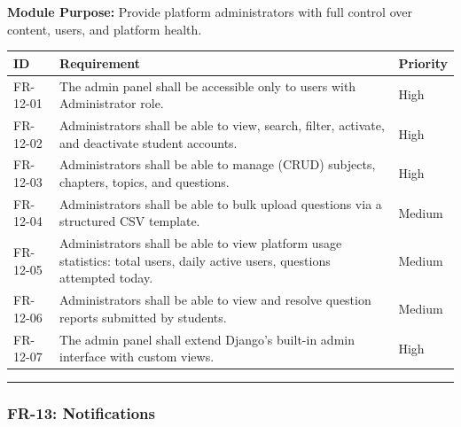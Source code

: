 \documentclass[
]{article}
\begin{document}
\textbf{Module Purpose:} Provide platform administrators with full
control over content, users, and platform health.

\begin{longtable}[]{@{}
  >{\raggedright\arraybackslash}p{}
  >{\raggedright\arraybackslash}p{}
  >{\raggedright\arraybackslash}p{}@{}}
\toprule\noalign{}
\begin{minipage}[b]{\linewidth}\raggedright
ID
\end{minipage} & \begin{minipage}[b]{\linewidth}\raggedright
Requirement
\end{minipage} & \begin{minipage}[b]{\linewidth}\raggedright
Priority
\end{minipage} \\
\midrule\noalign{}
\endhead
\bottomrule\noalign{}
\endlastfoot
FR-12-01 & The admin panel shall be accessible only to users with
Administrator role. & High \\
FR-12-02 & Administrators shall be able to view, search, filter,
activate, and deactivate student accounts. & High \\
FR-12-03 & Administrators shall be able to manage (CRUD) subjects,
chapters, topics, and questions. & High \\
FR-12-04 & Administrators shall be able to bulk upload questions via a
structured CSV template. & Medium \\
FR-12-05 & Administrators shall be able to view platform usage
statistics: total users, daily active users, questions attempted today.
& Medium \\
FR-12-06 & Administrators shall be able to view and resolve question
reports submitted by students. & Medium \\
FR-12-07 & The admin panel shall extend Django's built-in admin
interface with custom views. & High \\
\end{longtable}

\begin{center}\rule{0.5\linewidth}{0.5pt}\end{center}

\subsubsection{FR-13: Notifications}\label{fr-13-notifications}
\end{document}
